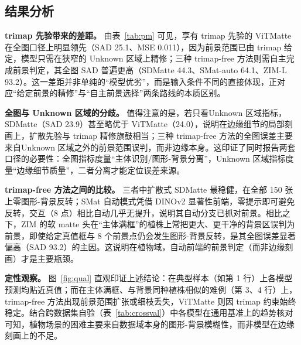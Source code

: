 \subsection{结果分析}

\textbf{trimap 先验带来的差距。} 由表~\ref{tab:pm} 可见，享有 trimap 先验的 ViTMatte 在全图口径上明显领先（SAD 25.1、MSE 0.011），因为前景范围已由 trimap 给定，模型只需在狭窄的 Unknown 区域上精修；三种 trimap-free 方法则需自主完成前景判定，其全图 SAD 普遍更高（SDMatte 44.3、SMat-auto 64.1、ZIM-L 93.2）。这一差距并非单纯的“模型优劣”，而是输入条件不同的直接体现，正对应“给定前景的精修”与“自主前景选择”两条路线的本质区别。

\textbf{全图与 Unknown 区域的分歧。} 值得注意的是，若只看Unknown 区域指标，SDMatte（SAD 23.9）甚至略优于 ViTMatte（24.0），说明在边缘细节的局部刻画上，扩散先验与 trimap 精修旗鼓相当；三种 trimap-free 方法的全图误差主要来自Unknown 区域之外的前景范围误判，而非边缘本身。这印证了同时报告两套口径的必要性：全图指标度量“主体识别/图形-背景分离”，Unknown 区域指标度量“边缘细节质量”，二者分离才能定位误差来源。

\textbf{trimap-free 方法之间的比较。} 三者中扩散式 SDMatte 最稳健，在全部 150 张上零图形-背景反转；SMat 自动模式凭借 DINOv2 显著性前端，零提示即可避免反转，交互（8 点）相比自动几乎无提升，说明其自动分支已抓对前景。相比之下，ZIM 的软 matte 头在“主体满框”的植株上常把更大、更干净的背景区误判为前景，即使给定真值框与 8 个前景点仍会发生图形-背景反转，是其全图误差显著偏高（SAD 93.2）的主因。这说明在植物域，自动前端的前景判定（而非边缘刻画）才是主要瓶颈。

\textbf{定性观察。} 图~\ref{fig:qual} 直观印证上述结论：在典型样本（如第 1 行）上各模型预测均贴近真值；而在主体满框、与背景同种植株相似的难例（第 3、4 行）上，trimap-free 方法出现前景范围扩张或细枝丢失，ViTMatte 则因 trimap 约束始终稳定。结合跨数据集自验（表~\ref{tab:crossval}）中各模型在通用基准上的趋势核对可知，植物场景的困难主要来自数据域本身的图形-背景模糊性，而非模型在边缘刻画上的不足。
